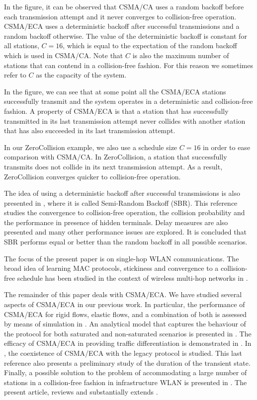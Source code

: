 \documentclass[journal]{IEEEtran}
\begin{document}
In the figure, it can be observed that CSMA/CA uses a random backoff before each transmission attempt and it never converges to collision-free operation. CSMA/ECA uses a deterministic backoff after successful transmissions and a random backoff otherwise. The value of the deterministic backoff is constant for all stations, $C=16$, which is equal to the expectation of the random backoff which is used in CSMA/CA. Note that $C$ is also the maximum number of stations that can contend in a collision-free fashion. For this reason we sometimes refer to $C$ as the capacity of the system.

In the figure, we can see that at some point all the CSMA/ECA stations successfully transmit and the system operates in a deterministic and collision-free fashion. A property of CSMA/ECA is that a station that has successfully transmitted in its last transmission attempt never collides with another station that has also succeeded in its last transmission attempt.

In our ZeroCollision example, we also use a schedule size $C=16$ in order to ease comparison with CSMA/CA. In ZeroCollision, a station that successfully transmits does not collide in its next transmission attempt. As a result, ZeroCollision converges quicker to collision-free operation.

The idea of using a deterministic backoff after successful transmissions is also presented in \cite{he2009sbr}, where it is called Semi-Random Backoff (SBR). This reference studies the convergence to collision-free operation, the collision probability and the performance in presence of hidden terminals. Delay measures are also presented and many other performance issues are explored. It is concluded that SBR performs equal or better than the random backoff in all possible scenarios.

The focus of the present paper is on single-hop WLAN communications. The broad idea of learning MAC protocols, stickiness and convergence to a collision-free schedule has been studied in the context of wireless multi-hop networks in \cite{yi2010msl,singh2007scc,lin1997amm}.

The remainder of this paper deals with CSMA/ECA. We have studied several aspects of CSMA/ECA in our previous work. In particular, the performance of CSMA/ECA for rigid flows, elastic flows, and a combination of both is assessed by means of simulation in \cite{bellalta2009vtc}. An analytical model that captures the behaviour of the protocol for both saturated and non-saturated scenarios is presented in \cite{barcelo2009cpa}. The efficacy of CSMA/ECA in providing traffic differentiation is demonstrated in \cite{barcelo2009tpc}. In \cite{barcelo2010fcc}, the coexistence of CSMA/ECA with the legacy protocol is studied. This last reference also presents a preliminary study of the duration of the transient state. Finally, a possible solution to the problem of accommodating a large number of stations in a collision-free fashion in infrastructure WLAN is presented in \cite{barcelo2010dpa}. The present article, reviews and substantially extends \cite{barcelo2010dpa}.
\end{document}
